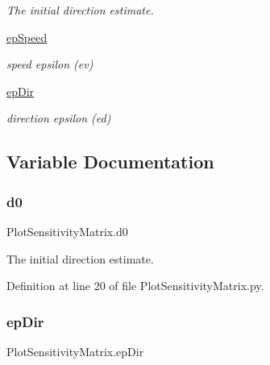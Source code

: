 \begin{DoxyCompactItemize}
\begin{DoxyCompactList}\small\item\em The initial direction estimate. \end{DoxyCompactList}\item 
\mbox{\hyperlink{namespace_plot_sensitivity_matrix_ab31b859e626585979a4ba8ba3c6f6c25}{ep\+Speed}}
\begin{DoxyCompactList}\small\item\em speed epsilon (ev) \end{DoxyCompactList}\item 
\mbox{\hyperlink{namespace_plot_sensitivity_matrix_a7e5c62140098f225cf198ae020a1fb65}{ep\+Dir}}
\begin{DoxyCompactList}\small\item\em direction epsilon (ed) \end{DoxyCompactList}\end{DoxyCompactItemize}


\subsection{Variable Documentation}
\mbox{\label{namespace_plot_sensitivity_matrix_ab6a17ada413ce5e414bbd5c3d6148868}} 
\subsubsection{\texorpdfstring{d0}{d0}}
{\footnotesize\ttfamily Plot\+Sensitivity\+Matrix.\+d0}



The initial direction estimate. 



Definition at line 20 of file Plot\+Sensitivity\+Matrix.\+py.

\mbox{\label{namespace_plot_sensitivity_matrix_a7e5c62140098f225cf198ae020a1fb65}} 
\subsubsection{\texorpdfstring{ep\+Dir}{epDir}}
{\footnotesize\ttfamily Plot\+Sensitivity\+Matrix.\+ep\+Dir}



